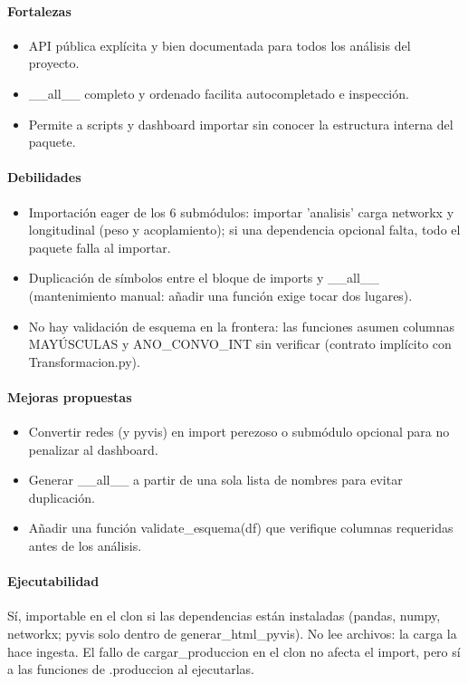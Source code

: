 \paragraph{Fortalezas}
\begin{itemize}
  \item API pública explícita y bien documentada para todos los análisis del proyecto.
  \item \_\_all\_\_ completo y ordenado facilita autocompletado e inspección.
  \item Permite a scripts y dashboard importar sin conocer la estructura interna del paquete.
\end{itemize}

\paragraph{Debilidades}
\begin{itemize}
  \item Importación eager de los 6 submódulos: importar 'analisis' carga networkx y longitudinal (peso y acoplamiento); si una dependencia opcional falta, todo el paquete falla al importar.
  \item Duplicación de símbolos entre el bloque de imports y \_\_all\_\_ (mantenimiento manual: añadir una función exige tocar dos lugares).
  \item No hay validación de esquema en la frontera: las funciones asumen columnas MAYÚSCULAS y ANO\_CONVO\_INT sin verificar (contrato implícito con Transformacion.py).
\end{itemize}

\paragraph{Mejoras propuestas}
\begin{itemize}
  \item Convertir redes (y pyvis) en import perezoso o submódulo opcional para no penalizar al dashboard.
  \item Generar \_\_all\_\_ a partir de una sola lista de nombres para evitar duplicación.
  \item Añadir una función validate\_esquema(df) que verifique columnas requeridas antes de los análisis.
\end{itemize}

\paragraph{Ejecutabilidad}
Sí, importable en el clon si las dependencias están instaladas (pandas, numpy, networkx; pyvis solo dentro de generar\_html\_pyvis). No lee archivos: la carga la hace ingesta. El fallo de cargar\_produccion en el clon no afecta el import, pero sí a las funciones de .produccion al ejecutarlas.

